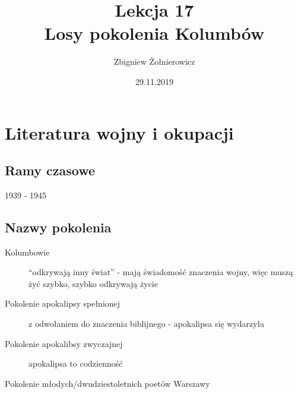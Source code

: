 \documentclass[a4paper]{article}
\begin{document}
\title{{\huge Lekcja 17} \\
{\large Losy pokolenia Kolumbów}}
\author{Zbigniew Żołnierowicz}
\date{29.11.2019}
\maketitle
\section{Literatura wojny i okupacji}
\subsection{Ramy czasowe}
1939 - 1945
\subsection{Nazwy pokolenia}
\begin{description}
    \item[Kolumbowie] ``odkrywają inny świat'' - mają świadomość znaczenia wojny, więc muszą żyć szybko, szybko odkrywają życie
    \item[Pokolenie apokalipsy spełnionej] z odwołaniem do znaczenia biblijnego - apokalipsa się wydarzyła
    \item[Pokolenie apokalibsy zwyczajnej] apokalipsa to codzienność
    \item[Pokolenie młodych/dwudziestoletnich poetów Warszawy] 
\end{description}
\end{document}
